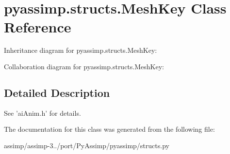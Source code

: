 \hypertarget{classpyassimp_1_1structs_1_1_mesh_key}{\section{pyassimp.\+structs.\+Mesh\+Key Class Reference}
\label{classpyassimp_1_1structs_1_1_mesh_key}
}


Inheritance diagram for pyassimp.\+structs.\+Mesh\+Key\+:


Collaboration diagram for pyassimp.\+structs.\+Mesh\+Key\+:


\subsection{Detailed Description}
\begin{DoxyVerb}See 'aiAnim.h' for details.
\end{DoxyVerb}
 

The documentation for this class was generated from the following file\+:\begin{DoxyCompactItemize}
\item 
assimp/assimp-\/3../port/\+Py\+Assimp/pyassimp/structs.\+py\end{DoxyCompactItemize}
